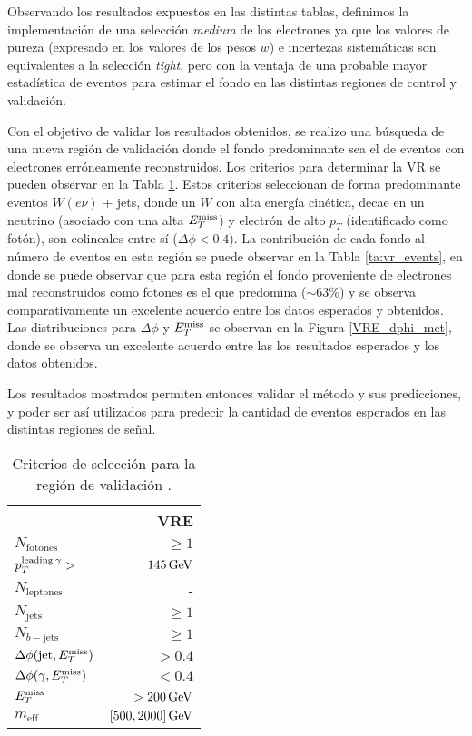 Observando los resultados expuestos en las distintas tablas, definimos la implementación de una selección \textit{medium} de los electrones ya que los valores de pureza (expresado en los valores de los pesos $w$) e incertezas sistemáticas son equivalentes a la selección \textit{tight}, pero con la ventaja de una probable mayor estadística de eventos para estimar el fondo en las distintas regiones de control y validación.


Con el objetivo de validar los resultados obtenidos, se realizo una búsqueda de una nueva región de validación donde el fondo predominante sea el de eventos con electrones erróneamente reconstruidos. Los criterios para determinar la VR se pueden observar en la Tabla \ref{ta:vr_crit}. Estos criterios seleccionan de forma predominante eventos $W(e\nu)$ + jets, donde un $W$ con alta energía cinética, decae en un neutrino (asociado con una alta $E_{T}^{\text{miss}}$) y electrón de alto $p_{T}$ (identificado como fotón), son colineales entre sí ($\Delta\phi<0.4$). La contribución de cada fondo al número de eventos en esta región se puede observar en la Tabla \ref{ta:vr_events}, en donde se puede observar que para esta región el fondo proveniente de electrones mal reconstruidos como fotones es el que predomina ($\sim63\%$) y se observa comparativamente un excelente acuerdo entre los datos esperados y obtenidos. Las distribuciones para $\Delta \phi$ y $E_{T}^{\text{miss}}$ se observan en la Figura \ref{VRE_dphi_met}, donde se observa un excelente acuerdo entre las los resultados esperados y los datos obtenidos.

Los resultados mostrados permiten entonces validar el método y sus predicciones, y poder ser así utilizados para predecir la cantidad de eventos esperados en las distintas regiones de señal.

\begin{table}
\centering
\caption{Criterios de selección para la región de validación \cite{drfran}.}
  \begin{tabular}{l|r}
  \hline
  \hline
  & VRE \\
  \hline
  $N_{\mathrm{fotones}}$                  &       $\ge1$  \\
  $p_{ T}^{\text{leading}\: \gamma} >$         &    $145\, \mathrm{GeV}$  \\
  $N_{\mathrm{leptones}}$                  &           -   \\
  $N_{\mathrm{jets}}$                     &       $\ge1$  \\
  $N_{b-\mathrm{jets}}$                   &       $\ge1$  \\
  $\Delta\phi(\text{jet}, E_{T}^{\text{miss}})$          &       $>0.4$  \\
  $\Delta\phi(\gamma, E_{T}^{\text{miss}})$                &       $<0.4$  \\
  ${E_{T}^{\text{miss}}}$                                &   $>200\, \mathrm{GeV}$  \\
  $m_{\text{eff}}$                               &  $[500, 2000]\, \mathrm{GeV}$  \\
  \hline
  \hline
\end{tabular}
\label{ta:vr_crit}
\end{table}

